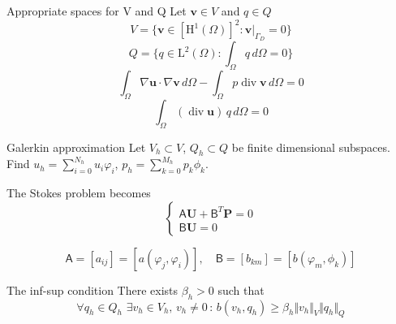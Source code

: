\documentclass[aspectratio=169]{beamer}
\begin{document}
\begin{frame}{\Large Appropriate spaces for V and Q}
  \Large
  Let $\mathbf{v} \in V$ and $q \in Q$
  \begin{equation*}
    V = \{ \mathbf{v} \in \left[ \mathrm{H}^1 (\Omega) \right]^2 : \mathbf{v} \vert_{\varGamma_D} = 0 \}
  \end{equation*}
  \begin{equation*}
    Q = \{q \in \mathrm{L}^2 (\Omega) : \int_{\Omega} q \, d\Omega = 0 \}
  \end{equation*}
  \begin{equation*}
    \int_{\Omega} \nabla \mathbf{u} \cdot \nabla \mathbf{v} \, d\Omega 
    -\int_{\Omega} p \operatorname{div} \mathbf{v} \, d\Omega 
    = 0
  \end{equation*}
  \begin{equation*}
    \int_{\Omega} (\operatorname{div} \mathbf{u}) \, q \, d\Omega = 0
  \end{equation*}
\end{frame}

\begin{frame}{\Large Galerkin approximation}
  \Large
  Let $V_h \subset V$, $Q_h \subset Q$ be finite dimensional subspaces. Find
  $u_h = \sum_{i=0}^{N_h} u_i \varphi_i$,
  $p_h = \sum_{k=0}^{M_h} p_k \phi_k$.

  The Stokes problem becomes
  \begin{equation*}
    \begin{cases}
      \mathsf{A}\mathbf{U} + \mathsf{B}^T \mathbf{P} = 0 \\
      \mathsf{B} \mathbf{U} = 0
    \end{cases}
  \end{equation*}
  
  \begin{equation*}
    \mathsf{A} = [a_{ij}] = [a(\varphi_j, \varphi_i)], \quad \mathsf{B} = [b_{km}] = [b(\varphi_m, \phi_k)] 
  \end{equation*}
\end{frame}

\begin{frame}{\Large The inf-sup condition}
  \Large
  There exists $\beta_h > 0$ such that
  \begin{equation*}
    \forall q_h \in Q_h \,\, \exists v_h \in V_h, \, v_h \neq 0 \,:\, b(v_h, q_h) \geq \beta_h \Vert v_h \Vert_V \Vert q_h \Vert_Q
  \end{equation*}
\end{frame}
\end{document}
